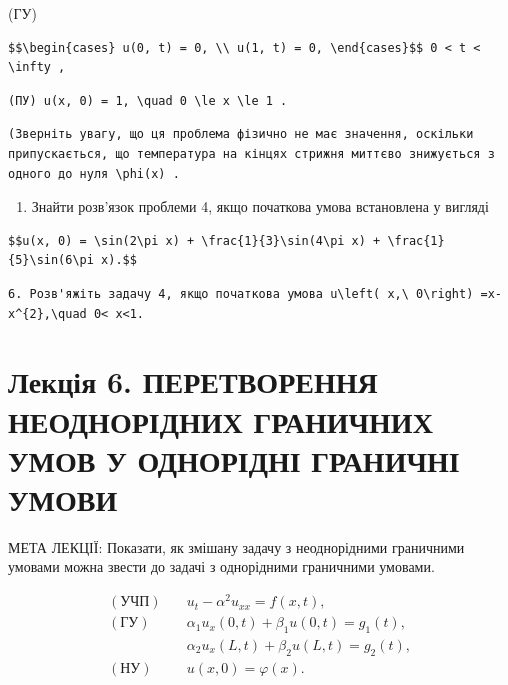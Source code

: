 \documentclass[
  ukrainian,
]{article}
\providecommand{\tightlist}{%
  \setlength{\itemsep}{0pt}\setlength{\parskip}{0pt}}
\begin{document}
(ГУ)

\begin{verbatim}
$$\begin{cases} u(0, t) = 0, \\ u(1, t) = 0, \end{cases}$$ 0 < t < \infty ,
\end{verbatim}

\begin{verbatim}
(ПУ) u(x, 0) = 1, \quad 0 \le x \le 1 .
\end{verbatim}

\begin{verbatim}
(Зверніть увагу, що ця проблема фізично не має значення, оскільки припускається, що температура на кінцях стрижня миттєво знижується з одного до нуля \phi(x) .
\end{verbatim}

\begin{enumerate}
\def\labelenumi{\arabic{enumi}.}
\setcounter{enumi}{4}
\tightlist
\item
  Знайти розв'язок проблеми 4, якщо початкова умова встановлена у
  вигляді
\end{enumerate}

\begin{verbatim}
$$u(x, 0) = \sin(2\pi x) + \frac{1}{3}\sin(4\pi x) + \frac{1}{5}\sin(6\pi x).$$
\end{verbatim}

\begin{verbatim}
6. Розв'яжіть задачу 4, якщо початкова умова u\left( x,\ 0\right) =x-x^{2},\quad 0< x<1.
\end{verbatim}

\section{Лекція 6. ПЕРЕТВОРЕННЯ НЕОДНОРІДНИХ ГРАНИЧНИХ УМОВ У ОДНОРІДНІ
ГРАНИЧНІ
УМОВИ}\label{ux43bux435ux43aux446ux456ux44f-6.-ux43fux435ux440ux435ux442ux432ux43eux440ux435ux43dux43dux44f-ux43dux435ux43eux434ux43dux43eux440ux456ux434ux43dux438ux445-ux433ux440ux430ux43dux438ux447ux43dux438ux445-ux443ux43cux43eux432-ux443-ux43eux434ux43dux43eux440ux456ux434ux43dux456-ux433ux440ux430ux43dux438ux447ux43dux456-ux443ux43cux43eux432ux438}

МЕТА ЛЕКЦІЇ: Показати, як змішану задачу з неоднорідними граничними
умовами можна звести до задачі з однорідними граничними умовами.

\[
\begin{aligned}
(\text{УЧП})\quad & u_t - \alpha^2 u_{xx} = f(x,t), \\
(\text{ГУ})\quad & \alpha_1 u_x(0,t) + \beta_1 u(0,t) = g_1(t), \\
& \alpha_2 u_x(L,t) + \beta_2 u(L,t) = g_2(t), \\
(\text{НУ})\quad & u(x,0) = \varphi(x).
\end{aligned}
\]
\end{document}
